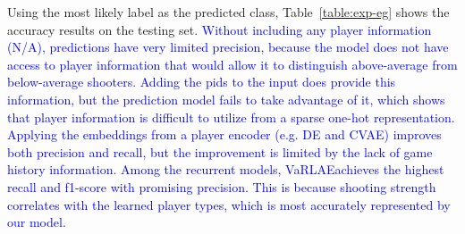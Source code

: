 \documentclass[letterpaper]{article} %
\newcommand{\system}{VaRLAE\;}
\begin{document}
Using the most likely label as the predicted class, Table~\ref{table:exp-eg} shows the accuracy results on the testing set. 
\textcolor{blue}{
Without including any player information (N/A), predictions have very limited precision, because the model does not have access to player information that would allow it to distinguish above-average from below-average shooters.
Adding the pids to the input does provide this information, but the prediction model fails to take advantage of it, which shows that player information is difficult to utilize from a sparse one-hot representation.
Applying the embeddings from a player encoder (e.g. DE and CVAE)  improves both precision and recall, but the improvement is limited by the lack of game history information.
Among the recurrent models, \system achieves the highest recall and f1-score with promising precision. This is because shooting strength correlates with the learned player types, which is most accurately represented by our model.}
\end{document}
